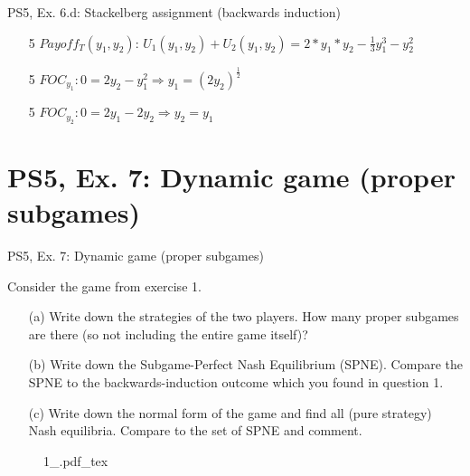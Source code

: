\begin{frame}{PS5, Ex. 6.d: Stackelberg assignment (backwards induction)}
\begin{multicols}{2}
\begin{itemize}
        \item[5] $Payoff_T(y_1,y_2)$: $U_1(y_1,y_2)+U_2(y_1,y_2) = 2*y_1*y_2-\frac{1}{3}y_1^3 - y_2^2$ \\
        \item[5] $FOC_{y_1}: 0=2y_2-y_1^2 \Rightarrow y_1=(2y_2)^{\frac{1}{2}}$ \\
        \item[5] $FOC_{y_2}: 0=2y_1-2y_2 \Rightarrow y_2=y_1$ \\
    \end{itemize}
  \end{multicols}
\end{frame}



\section{PS5, Ex. 7: Dynamic game (proper subgames)}

\begin{frame}{PS5, Ex. 7: Dynamic game (proper subgames)}
  \begin{multicols}{2}
    Consider the game from exercise 1.
    \begin{itemize}
      \item[(a)] Write down the strategies of the two players. How many proper subgames are there (so not including the entire game itself)?
      \item[(b)] Write down the Subgame-Perfect Nash Equilibrium (SPNE). Compare the SPNE to the backwards-induction outcome which you found in question 1.
      \item[(c)] Write down the normal form of the game and find all (pure strategy) Nash equilibria. Compare to the set of SPNE and comment.
    \end{itemize}
    \vfill\null \columnbreak
    \begin{figure}[!h]
      \center
      \def\svgwidth{.8\columnwidth}
      {1_.pdf_tex}
    \end{figure}
    \vfill\null
  \end{multicols}
\end{frame}

